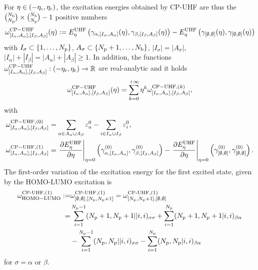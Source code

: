 \documentclass[11pt]{article}
\def\R{{\mathbb R}}
\begin{document}
\medskip

For $\eta \in (-\eta_{\rm c},\eta_{\rm c})$, the excitation energies obtained by CP-UHF are thus the $\binom{N_{\rm b}}{N_{\rm p}} \times \binom{N_{\rm b}}{N_{\rm p}}-1$ positive numbers
\begin{equation} \label{eq:CP_HF}
\omega_{[I_\alpha,A_\alpha],[I_\beta,A_\beta]}^{{\rm CP-UHF}}(\eta) :=   E^{\rm UHF}_\eta\left(\gamma_{\alpha,[I_\alpha,A_\alpha]}(\eta),\gamma_{\beta,[I_\beta,A_\beta]}(\eta)\right) -  E^{\rm UHF}_\eta\left(\gamma_{[\emptyset,\emptyset]}(\eta),\gamma_{[\emptyset,\emptyset]}(\eta)\right)
\end{equation}
with $I_\sigma \subset \{1,\ldots,N_{\rm p}\}$, $A_\sigma \subset \{N_{\rm p}+1,\ldots,N_{\rm b}\}$, $|I_\sigma|=|A_\sigma|$, $|I_\alpha|+|I_\beta|=|A_\alpha|+|A_\beta| \ge 1$.
In addition, the functions $\omega_{[I_\alpha,A_\alpha],[I_\beta,A_\beta]}^{{\rm CP-UHF}}:(-\eta_{\rm c},\eta_{\rm c})\to \R$ are real-analytic and it holds
$$
 \omega_{[I_\alpha,A_\alpha],[I_\beta,A_\beta]}^{{\rm CP-UHF}}(\eta)=\sum_{k=0}^{+\infty} \eta^k \omega_{[I_\alpha,A_\alpha],[I_\beta,A_\beta]}^{{\rm CP-UHF},(k)},
 $$
 with
\begin{align}
\omega_{[I_\alpha,A_\alpha],[I_\beta,A_\beta]}^{{\rm CP-UHF},(0)}&=\sum_{a \in A_\alpha \cup A_\beta} \varepsilon_a^0 - \sum_{i\in I_\alpha \cup I_\beta} \varepsilon_i^0, \nonumber\\
\omega_{[I_\alpha,A_\alpha],[I_\beta,A_\beta]}^{{\rm CP-UHF},(1)}&=\left. \frac{\partial E^{\rm UHF}_\eta}{\partial \eta}\right|_{\eta=0}\left( \gamma_{\alpha,[I_\alpha,A_\alpha]}^{(0)},\gamma_{\beta,[I_\beta,A_\beta]}^{(0)} \right) - \left. \frac{\partial E^{\rm UHF}_\eta}{\partial \eta}\right|_{\eta=0}\left(  \gamma^{(0)}_{[\emptyset,\emptyset]} ,\gamma^{(0)}_{[\emptyset,\emptyset]} \right). \nonumber
\end{align}
The first-order variation of the excitation energy for the first excited state, given by the HOMO-LUMO excitation is 
\begin{align}
 \omega^{\text{CP-UHF},(1)}_{\rm HOMO-LUMO} 
 :=&
    \omega^{\text{CP-UHF},(1)}_{[\emptyset,\emptyset],[N_{\rm p},N_{\rm p}+1]} = \omega^{\text{CP-UHF},(1)}_{[N_{\rm p},N_{\rm p}+1],[\emptyset,\emptyset]} \nonumber  \\ =& \sum_{i=1}^{N_{\rm p}-1}(N_{\rm p}+1,N_{\rm p}+1||i,i)_{\sigma\sigma}+\sum_{i=1}^{N_{\rm p}} (N_{\rm p}+1,N_{\rm p}+1|i,i)_{\beta\alpha} \nonumber \\
    &-\sum_{i=1}^{N_{\rm p}-1}(N_{\rm p},N_{\rm p}||i,i)_{\sigma\sigma} -\sum_{i=1}^{N_{\rm p}} (N_{\rm p},N_{\rm p}|i,i)_{\beta\alpha}
    \label{eqn:UHF CP excitation energy first order}
\end{align}
for $\sigma=\alpha$ or $\beta$.
\end{document}
